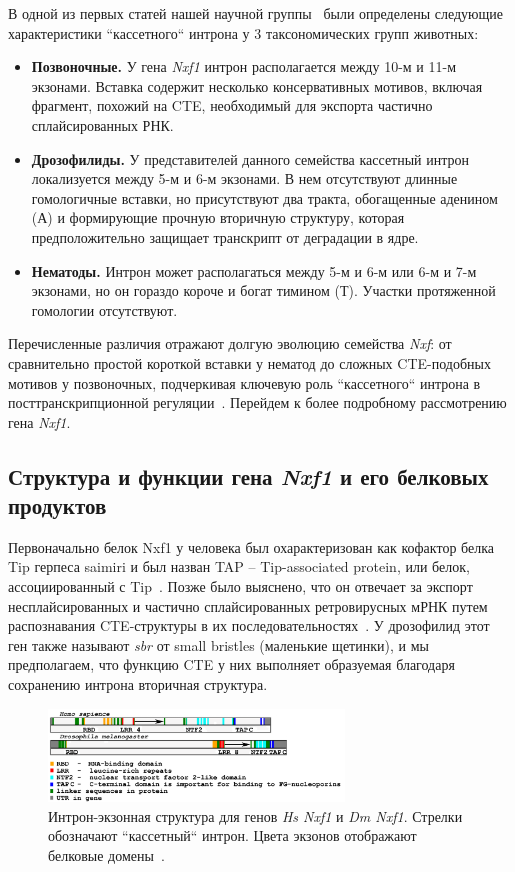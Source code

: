 В одной из первых статей нашей научной группы~\cite{Mamon2013} были определены следующие характеристики ``кассетного`` интрона у 3 таксономических групп животных:

\begin{itemize}
  \item \textbf{Позвоночные.} У гена \textit{Nxf1} интрон располагается между 10-м и 11-м экзонами. Вставка содержит несколько консервативных мотивов, включая фрагмент, похожий на CTE, необходимый для экспорта частично сплайсированных РНК.
  \item \textbf{Дрозофилиды.} У представителей данного семейства кассетный интрон локализуется между 5-м и 6-м экзонами. В нем отсутствуют длинные гомологичные вставки, но присутствуют два тракта, обогащенные аденином (А) и формирующие прочную вторичную структуру, которая предположительно защищает транскрипт от деградации в ядре.
  \item \textbf{Нематоды.} Интрон может располагаться между 5-м и 6-м или 6-м и 7-м экзонами, но он гораздо короче и богат тимином (Т). Участки протяженной гомологии отсутствуют.
\end{itemize}

Перечисленные различия отражают долгую эволюцию семейства \textit{Nxf}: от сравнительно простой короткой вставки у нематод до сложных CTE-подобных мотивов у позвоночных, подчеркивая ключевую роль ``кассетного`` интрона в посттранскрипционной регуляции~\cite{Golubkova2012, Mamon2013}.
Перейдем к более подробному рассмотрению гена \textit{Nxf1}.


\subsection{Структура и функции гена \textit{Nxf1} и его белковых продуктов}

Первоначально белок Nxf1 у человека был охарактеризован как кофактор белка Tip герпеса saimiri и был назван TAP – Tip-associated protein, или белок, ассоциированный с Tip~\cite{Yoon1997}.
Позже было выяснено, что он отвечает за экспорт несплайсированных и частично сплайсированных ретровирусных мРНК путем распознавания CTE-структуры в их последовательностях~\cite{Zolotukhin2001}.
У дрозофилид этот ген также называют \textit{sbr} от small bristles (маленькие щетинки), и мы предполагаем, что функцию CTE у них выполняет образуемая благодаря сохранению интрона вторичная структура.

\begin{figure}[h] %
    \centering
    \includegraphics[width=0.7\textwidth]{images/dm_hs_nxf1_structure}
    \caption{Интрон-экзонная структура для генов \textit{Hs Nxf1} и \textit{Dm Nxf1}. Стрелки обозначают ``кассетный`` интрон. Цвета экзонов отображают белковые домены~\cite{Mamon2013}.}
    \label{fig:dm_hs_nxf1_structure}
\end{figure}

